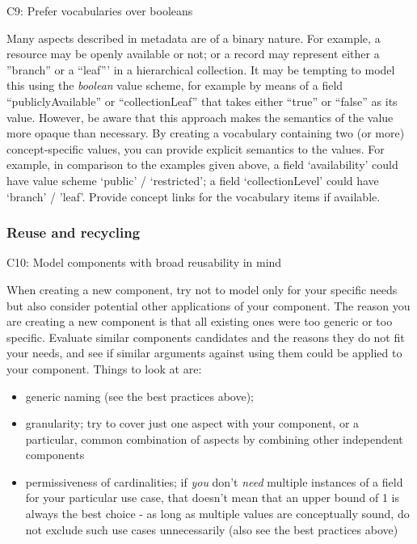 C9: Prefer vocabularies over booleans


Many aspects described in metadata are of a binary nature. For example, a resource may be openly available or not; or a record may represent either a ''branch'' or a ``leaf''' in a hierarchical collection. It may be tempting to model this using the \emph{boolean} value scheme, for example by means of a field ``publiclyAvailable'' or ``collectionLeaf'' that takes either ``true'' or ``false'' as its value. However, be aware
that this approach makes the semantics of the value more opaque than necessary. By creating a vocabulary containing two (or more) concept-specific values, you can provide explicit semantics to the values. For example, in comparison to the examples given above, a field `availability' could have value scheme `public' / `restricted'; a field `collectionLevel' could have `branch' / 'leaf'. Provide concept links
for the vocabulary items if available.

\subsubsection{Reuse and recycling} \label{reuse-and-recycling}

C10: Model components with broad reusability in mind


When creating a new component, try not to model only for your specific needs but also consider potential other applications of your component. The reason you are creating a new component is that all existing ones were too generic or too specific. Evaluate similar components candidates and the reasons they do not fit your needs, and see if similar arguments against using them could be applied to your component. Things to look at
are:

\begin{itemize}
\tightlist
\item
  generic naming (see the  best practices above);
\item
  granularity; try to cover just one aspect with your component, or a particular, common combination of aspects by combining other independent components
\item
  permissiveness of cardinalities; if \emph{you} don't \emph{need} multiple instances of a field for your particular use case, that doesn't mean that an upper bound of 1 is always the best choice - as long as multiple values are conceptually sound, do not exclude such use cases unnecessarily (also see the  best practices above)
\end{itemize}

